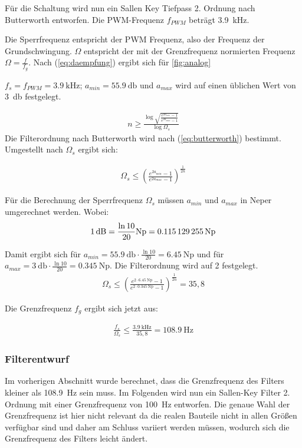 Für die Schaltung wird nun ein Sallen Key Tiefpass 2. Ordnung nach Butterworth entworfen. Die PWM-Frequenz $f_{PWM}$ beträgt \SI{3,9}{\kilo\hertz}.

Die Sperrfrequenz entspricht der PWM Frequenz, also der Frequenz der Grundschwingung. $\Omega$ entspricht der mit der Grenzfrequenz 
normierten Frequenz $\Omega=\frac{f}{f_g}$. Nach (\ref{eq:daempfung}) ergibt sich für \ref{fig:analog}

$f_s=f_{PWM}=\SI{3,9}{\kilo\hertz}$; $a_{min}=\SI{55,9}{\decibel}$ und $a_{max}$ wird auf einen üblichen Wert von \SI{3}{\decibel} festgelegt.







\begin{align}
n \ge \frac{\log{\sqrt{\frac{e^{2a_{min}}-1}{e^{2a_{max}}-1}}}}{\log{\Omega_s}}
\label{eq:butterworth}
\end{align}
Die Filterordnung nach Butterworth wird nach (\ref{eq:butterworth}) bestimmt\cite{AnalogFilter}. Umgestellt nach $\Omega_s$ ergibt sich:

\begin{align}
\Omega_s \le  \left(\frac{e^{2a_{min}}-1}{e^{2a_{max}}-1}\right)^{\frac{1}{2n}}
\end{align}



Für die Berechnung der Sperrfrequenz $\Omega_s$ müssen  $a_{min}$ und $a_{max}$ in Neper umgerechnet werden. Wobei:
\begin{align*}
\SI{1}{\decibel} =  \frac{\ln{10}}{20}\si{{\neper}} = \SI{0,115129255}{\neper}   
\end{align*}

Damit ergibt sich für $a_{min}=\SI{55,9}{\decibel}\cdot \frac{\ln{10}}{20}=\SI{6,45}{\neper}$ und für  $a_{max}=\SI{3}{\decibel}\cdot \frac{\ln{10}}{20}=\SI{0,345}{\neper}$. Die Filterordnung wird auf 2 festgelegt.
\begin{align}
\Omega_s \le  \left(\frac{e^{2\cdot\SI{6,45}{\neper} }-1}{e^{2\cdot \SI{0,345}{\neper}}-1}\right)^{\frac{1}{2n}}  = 35,8
\end{align}

Die Grenzfrequenz $f_g$ ergibt sich jetzt aus:

\begin{align}
\frac{f_s}{\Omega_s} \le \frac{\SI{3,9}{\kilo\hertz}}{35,8} = \SI{108,9}{\hertz}
\end{align}

\subsubsection{Filterentwurf}
Im vorherigen Abschnitt wurde berechnet, dass die Grenzfrequenz des Filters kleiner als \SI{108,9}{\hertz} sein muss.
Im Folgenden wird nun ein Sallen-Key Filter 2. Ordnung mit einer Grenzfrequenz von \SI{100}{\hertz} entworfen.
Die genaue Wahl der Grenzfrequenz ist hier nicht relevant da die realen Bauteile nicht in  allen Größen 
verfügbar sind und daher am Schluss variiert werden müssen, wodurch sich die Grenzfrequenz des Filters leicht ändert.


